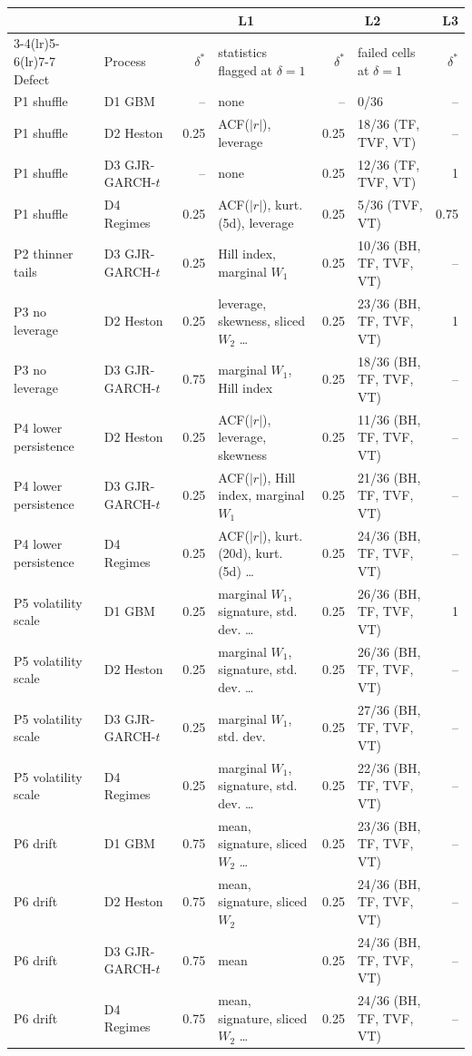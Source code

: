 \begin{tabular}{llrp{3.6cm}rp{3.0cm}r}
\toprule
& & \multicolumn{2}{c}{L1} & \multicolumn{2}{c}{L2} & L3 \\
\cmidrule(lr){3-4}\cmidrule(lr){5-6}\cmidrule(lr){7-7}
Defect & Process & $\delta^{*}$ & statistics flagged at $\delta=1$ & $\delta^{*}$ & failed cells at $\delta=1$ & $\delta^{*}$ \\
\midrule
P1 shuffle & D1 GBM & -- & none & -- & 0/36 & -- \\
P1 shuffle & D2 Heston & 0.25 & ACF($|r|$), leverage & 0.25 & 18/36 (TF, TVF, VT) & -- \\
P1 shuffle & D3 GJR-GARCH-$t$ & -- & none & 0.25 & 12/36 (TF, TVF, VT) & 1 \\
P1 shuffle & D4 Regimes & 0.25 & ACF($|r|$), kurt. (5d), leverage & 0.25 & 5/36 (TVF, VT) & 0.75 \\
P2 thinner tails & D3 GJR-GARCH-$t$ & 0.25 & Hill index, marginal $W_1$ & 0.25 & 10/36 (BH, TF, TVF, VT) & -- \\
P3 no leverage & D2 Heston & 0.25 & leverage, skewness, sliced $W_2$ \dots & 0.25 & 23/36 (BH, TF, TVF, VT) & 1 \\
P3 no leverage & D3 GJR-GARCH-$t$ & 0.75 & marginal $W_1$, Hill index & 0.25 & 18/36 (BH, TF, TVF, VT) & -- \\
P4 lower persistence & D2 Heston & 0.25 & ACF($|r|$), leverage, skewness & 0.25 & 11/36 (BH, TF, TVF, VT) & -- \\
P4 lower persistence & D3 GJR-GARCH-$t$ & 0.25 & ACF($|r|$), Hill index, marginal $W_1$ & 0.25 & 21/36 (BH, TF, TVF, VT) & -- \\
P4 lower persistence & D4 Regimes & 0.25 & ACF($|r|$), kurt. (20d), kurt. (5d) \dots & 0.25 & 24/36 (BH, TF, TVF, VT) & -- \\
P5 volatility scale & D1 GBM & 0.25 & marginal $W_1$, signature, std. dev. \dots & 0.25 & 26/36 (BH, TF, TVF, VT) & 1 \\
P5 volatility scale & D2 Heston & 0.25 & marginal $W_1$, signature, std. dev. \dots & 0.25 & 26/36 (BH, TF, TVF, VT) & -- \\
P5 volatility scale & D3 GJR-GARCH-$t$ & 0.25 & marginal $W_1$, std. dev. & 0.25 & 27/36 (BH, TF, TVF, VT) & -- \\
P5 volatility scale & D4 Regimes & 0.25 & marginal $W_1$, signature, std. dev. \dots & 0.25 & 22/36 (BH, TF, TVF, VT) & -- \\
P6 drift & D1 GBM & 0.75 & mean, signature, sliced $W_2$ \dots & 0.25 & 23/36 (BH, TF, TVF, VT) & -- \\
P6 drift & D2 Heston & 0.75 & mean, signature, sliced $W_2$ & 0.25 & 24/36 (BH, TF, TVF, VT) & -- \\
P6 drift & D3 GJR-GARCH-$t$ & 0.75 & mean & 0.25 & 24/36 (BH, TF, TVF, VT) & -- \\
P6 drift & D4 Regimes & 0.75 & mean, signature, sliced $W_2$ \dots & 0.25 & 24/36 (BH, TF, TVF, VT) & -- \\
\bottomrule
\end{tabular}
